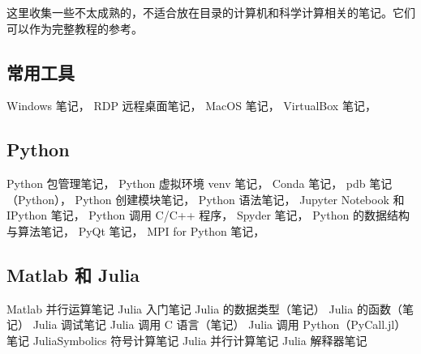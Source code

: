 
这里收集一些不太成熟的，不适合放在目录的计算机和科学计算相关的笔记。它们可以作为完整教程的参考。

\subsection{常用工具}
Windows 笔记，
RDP 远程桌面笔记，
MacOS 笔记，
VirtualBox 笔记，

\subsection{Python}
Python 包管理笔记，
Python 虚拟环境 venv 笔记，
Conda 笔记，
pdb 笔记（Python），
Python 创建模块笔记，
Python 语法笔记，
Jupyter Notebook 和 IPython 笔记，
Python 调用 C/C++ 程序，
Spyder 笔记，
Python 的数据结构与算法笔记，
PyQt 笔记，
MPI for Python 笔记，

\subsection{Matlab 和 Julia}
Matlab 并行运算笔记
Julia 入门笔记
Julia 的数据类型（笔记）
Julia 的函数（笔记）
Julia 调试笔记
Julia 调用 C 语言（笔记）
Julia 调用 Python（PyCall.jl）笔记
JuliaSymbolics 符号计算笔记
Julia 并行计算笔记
Julia 解释器笔记

